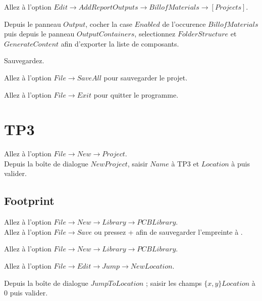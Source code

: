 \documentclass{report}
\begin{document}
\begin{asparaenum}[$\circ$]
    \item Allez à l'option $Edit \rightarrow Add Report Outputs \rightarrow Bill of Materials \rightarrow [Projects]$.
    \item Depuis le panneau $Output$, cocher la case $Enabled$ de l'occurence $Bill of Materials$ puis depuis le panneau $Output Containers$, selectionnez $Folder Structure$ et $Generate Content$ afin d'exporter la liste de composants.
    \item Sauvegardez. \\
\end{asparaenum}

Allez à l'option $File \rightarrow Save All$ pour sauvegarder le projet. \par
Allez à l'option $File \rightarrow Exit$ pour quitter le programme.

\newpage
\section{TP3}

Allez à l'option $File \rightarrow New \rightarrow Project$. \\
Depuis la boîte de dialogue $New Project$, saisir $Name$ à \og TP3 \fg{ } et $Location$ à  puis valider.

\subsection{Footprint}

Allez à l'option $File \rightarrow New \rightarrow Library \rightarrow PCB Library$. \\
Allez à l'option $File \rightarrow Save$ ou pressez \Ctrl +  afin de sauvegarder l'empreinte à . \\

\begin{asparaenum}[$\circ$]
    \item Allez à l'option $File \rightarrow New \rightarrow Library \rightarrow PCB Library$. \\
    \item Allez à l'option $File \rightarrow Edit \rightarrow Jump \rightarrow New Location$. \\
    \item Depuis la boîte de dialogue $Jump To Location$ ; saisir les champs $\{x,y\}Location$ à $0$ puis valider. \\
\end{asparaenum}
\end{document}

